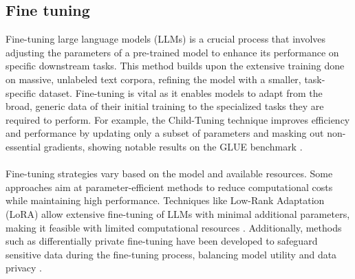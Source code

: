 \subsection*{Fine tuning} %
Fine-tuning large language models (LLMs) is a crucial process that involves adjusting the parameters of a pre-trained model to enhance its performance on specific downstream tasks. This method builds upon the extensive training done on massive, unlabeled text corpora, refining the model with a smaller, task-specific dataset. Fine-tuning is vital as it enables models to adapt from the broad, generic data of their initial training to the specialized tasks they are required to perform. For example, the Child-Tuning technique improves efficiency and performance by updating only a subset of parameters and masking out non-essential gradients, showing notable results on the GLUE benchmark \cite{xu-etal-2021-raise}.
\\\\
Fine-tuning strategies vary based on the model and available resources. Some approaches aim at parameter-efficient methods to reduce computational costs while maintaining high performance. Techniques like Low-Rank Adaptation (LoRA) allow extensive fine-tuning of LLMs with minimal additional parameters, making it feasible with limited computational resources \cite{sun2023comparative}. Additionally, methods such as differentially private fine-tuning have been developed to safeguard sensitive data during the fine-tuning process, balancing model utility and data privacy \cite{yu2022differentially}.


